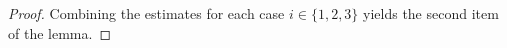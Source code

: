 \documentclass[11pt,a4paper,oneside,reqno]{amsart}
\newcommand{\Gnp}{G_{n, p}^{(3)}}
\newcommand{\cF}{\mathcal{F}}
\renewcommand{\Pr}{\mathbb{P}}
\newcommand{\1}{\mathbbm{1}} %
\renewcommand{\le}{\leqslant}
\newcommand{\cFQL}{\cF_Q^{\mathrm{low}}}
\newcommand{\ext}{\mathrm{ext}}
\begin{document}
\begin{proof}
    Combining the estimates for each case $i \in \{1,2,3\}$ yields the second item of the lemma. \qedhere

    




\end{proof}
\end{document}
